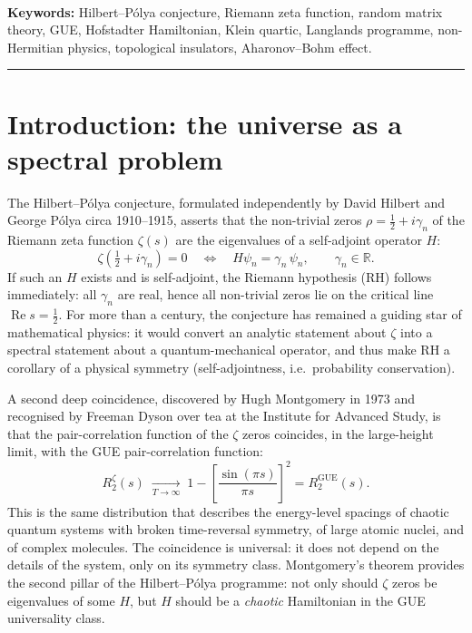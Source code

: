 \documentclass[11pt,a4paper]{article}
\theoremstyle{plain}
\theoremstyle{definition}
\theoremstyle{remark}
\begin{document}
\begin{center}
\begin{minipage}{0.85\textwidth}
    \end{minipage}\\[1.2em]
    \textbf{Keywords:} Hilbert--Pólya conjecture, Riemann zeta function, random matrix theory, GUE, Hofstadter Hamiltonian, Klein quartic, Langlands programme, non-Hermitian physics, topological insulators, Aharonov--Bohm effect.
\end{center}

\vspace{1em}
\hrule
\vspace{0.6em}

\section{Introduction: the universe as a spectral problem}

The Hilbert--Pólya conjecture, formulated independently by David Hilbert and George Pólya circa 1910--1915, asserts that the non-trivial zeros $\rho = \tfrac{1}{2} + i\gamma_n$ of the Riemann zeta function $\zeta(s)$ are the eigenvalues of a self-adjoint operator $H$:
\begin{equation}\label{eq:HP}
    \zeta\!\left(\tfrac{1}{2} + i\gamma_n\right) = 0 \quad\Longleftrightarrow\quad H\psi_n = \gamma_n\,\psi_n,\qquad \gamma_n\in\mathbb{R}.
\end{equation}
If such an $H$ exists and is self-adjoint, the Riemann hypothesis (RH) follows immediately: all $\gamma_n$ are real, hence all non-trivial zeros lie on the critical line $\operatorname{Re}s = \tfrac{1}{2}$. For more than a century, the conjecture has remained a guiding star of mathematical physics: it would convert an analytic statement about $\zeta$ into a spectral statement about a quantum-mechanical operator, and thus make RH a corollary of a physical symmetry (self-adjointness, i.e.\ probability conservation).

A second deep coincidence, discovered by Hugh Montgomery in 1973 and recognised by Freeman Dyson over tea at the Institute for Advanced Study, is that the pair-correlation function of the $\zeta$ zeros coincides, in the large-height limit, with the GUE pair-correlation function:
\begin{equation}\label{eq:Montgomery}
    R_2^{\zeta}(s) \;\xrightarrow[T\to\infty]{}\; 1 - \left[\frac{\sin(\pi s)}{\pi s}\right]^2 = R_2^{\mathrm{GUE}}(s).
\end{equation}
This is the same distribution that describes the energy-level spacings of chaotic quantum systems with broken time-reversal symmetry, of large atomic nuclei, and of complex molecules. The coincidence is universal: it does not depend on the details of the system, only on its symmetry class. Montgomery's theorem provides the second pillar of the Hilbert--Pólya programme: not only should $\zeta$ zeros be eigenvalues of some $H$, but $H$ should be a \emph{chaotic} Hamiltonian in the GUE universality class.
\end{document}
